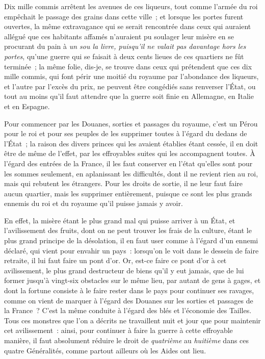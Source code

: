 \documentclass[french,twoside]{book} %
\begin{document}
Dix mille commis arrêtent les avenues de ces liqueurs, tout comme l’armée du roi empêchait le passage des grains dans cette ville ; et lorsque les portes furent ouvertes, la même extravagance qui se serait rencontrée dans ceux qui auraient allégué que ces habitants affamés n’auraient pu soulager leur misère en se procurant du pain à {\itshape un sou la livre, puisqu’il ne valait pas davantage hors les portes}, qu’une guerre qui se faisait à deux cents lieues de ces quartiers ne fût terminée ; la même folie, dis-je, se trouve dans ceux qui prétendent que ces dix mille commis, qui font périr une moitié du royaume par l’abondance des liqueurs, et l’autre par l’excès du prix, ne peuvent être congédiés sans renverser l’État, ou tout au moins qu’il faut attendre que la guerre soit finie en Allemagne, en Italie et en Espagne.\par
Pour commencer par les Douanes, sorties et passages du royaume, c’est un Pérou pour le roi et pour ses peuples de les supprimer toutes à l’égard du dedans de l’État ; la raison des divers princes qui les avaient établies étant cessée, il en doit être de même de l’effet, par les effroyables suites qui les accompagnent toutes. À l’égard des entrées de la France, il les faut conserver en l’état qu’elles sont pour les sommes seulement, en aplanissant les difficultés, dont il ne revient rien au roi, mais qui rebutent les étrangers. Pour les droits de sortie, il ne leur faut faire aucun quartier, mais les supprimer entièrement, puisque ce sont les plus grands ennemis du roi et du royaume qu’il puisse jamais y avoir.\par
En effet, la misère étant le plus grand mal qui puisse arriver à un État, et l’avilissement des fruits, dont on ne peut trouver les frais de la culture, étant le plus grand principe de la désolation, il en faut user comme à l’égard d’un ennemi déclaré, qui vient pour envahir un pays : lorsqu’on le voit dans le dessein de faire retraite, il lui faut faire un pont d’or. Or, est-ce faire ce pont d’or à cet avilissement, le plus grand destructeur de biens qu’il y eut jamais, que de lui former jusqu’à vingt-six obstacles sur le même lieu, par autant de gens à gages, et dont la fortune consiste à le faire rester dans le pays pour continuer ses ravages, comme on vient de marquer à l’égard des Douanes sur les sorties et passages de la France ? C’est la même conduite à l’égard des blés et l’économie des Tailles. Tous ces monstres que l’on a décrits ne travaillent nuit et jour que pour maintenir cet avilissement : ainsi, pour continuer à faire la guerre à cette effroyable manière, il faut absolument réduire le droit de {\itshape quatrième} au {\itshape huitième} dans ces quatre Généralités, comme partout ailleurs où les Aides ont lieu.\par
\end{document}
